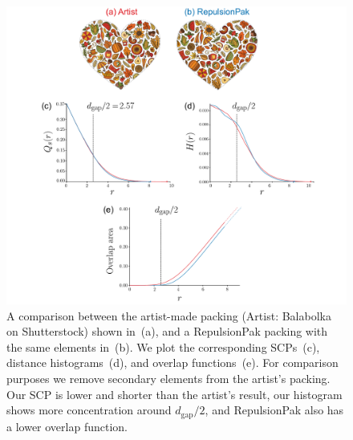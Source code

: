 \begin{figure}
\centering
\includegraphics[width=1.0\textwidth]{figures/metrics/balabolka_comparison_big.pdf}
\caption[A comparison between the artist-made packing \newline  and a RepulsionPak packing]
{ \label{balabolka_comparison} 
A comparison between the artist-made packing (Artist: Balabolka on Shutterstock) shown in~(a), and a RepulsionPak packing
with the same elements in~(b).  We plot the corresponding SCPs~(c),
distance histograms~(d), and overlap functions~(e).
For comparison purposes we remove secondary elements from the artist's
packing.  Our SCP is lower and shorter than the artist's result,
our histogram shows more concentration around $d_\mathrm{gap} / 2$,
and RepulsionPak also has a lower overlap function.
}
\end{figure}

